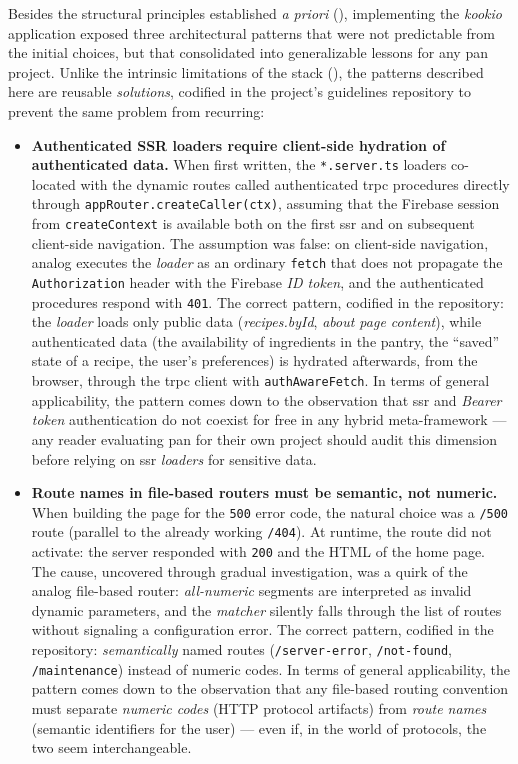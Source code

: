 Besides the structural principles established \textit{a priori} (), implementing the \textit{\gls{kookio}} application exposed three architectural patterns that were not predictable from the initial choices, but that consolidated into generalizable lessons for any \gls{pan} project. Unlike the intrinsic limitations of the stack (), the patterns described here are reusable \textit{solutions}, codified in the project's guidelines repository to prevent the same problem from recurring:

\begin{itemize}
  \item \textbf{Authenticated SSR loaders require client-side hydration of authenticated data.} When first written, the \texttt{*.server.ts} loaders co-located with the dynamic routes called authenticated \acrshort{trpc} procedures directly through \texttt{appRouter.createCaller(ctx)}, assuming that the Firebase session from \texttt{createContext} is available both on the first \acrshort{ssr} and on subsequent client-side navigation. The assumption was false: on client-side navigation, \gls{analog} executes the \textit{loader} as an ordinary \texttt{fetch} that does not propagate the \texttt{Authorization} header with the Firebase \textit{ID token}, and the authenticated procedures respond with \texttt{401}. The correct pattern, codified in the repository: the \textit{loader} loads only public data (\textit{recipes.byId}, \textit{about page content}), while authenticated data (the availability of ingredients in the pantry, the “saved” state of a recipe, the user's preferences) is hydrated afterwards, from the browser, through the \gls{trpc} client with \texttt{authAwareFetch}. In terms of general applicability, the pattern comes down to the observation that \acrshort{ssr} and \textit{Bearer token} authentication do not coexist for free in any hybrid meta-framework --- any reader evaluating \gls{pan} for their own project should audit this dimension before relying on \acrshort{ssr} \textit{loaders} for sensitive data.

  \item \textbf{Route names in file-based routers must be semantic, not numeric.} When building the page for the \texttt{500} error code, the natural choice was a \texttt{/500} route (parallel to the already working \texttt{/404}). At runtime, the route did not activate: the server responded with \texttt{200} and the HTML of the home page. The cause, uncovered through gradual investigation, was a quirk of the \gls{analog} file-based router: \textit{all-numeric} segments are interpreted as invalid dynamic parameters, and the \textit{matcher} silently falls through the list of routes without signaling a configuration error. The correct pattern, codified in the repository: \textit{semantically} named routes (\texttt{/server-error}, \texttt{/not-found}, \texttt{/maintenance}) instead of numeric codes. In terms of general applicability, the pattern comes down to the observation that any file-based routing convention must separate \textit{numeric codes} (HTTP protocol artifacts) from \textit{route names} (semantic identifiers for the user) --- even if, in the world of protocols, the two seem interchangeable.


\end{itemize}
